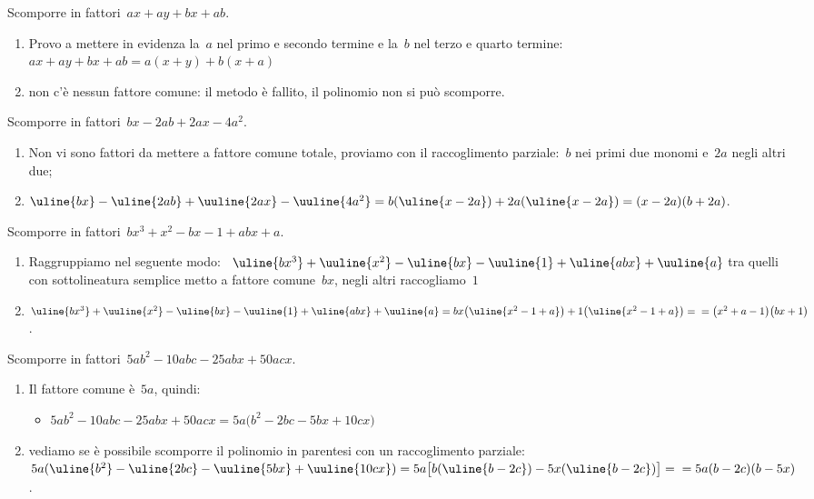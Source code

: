 \begin{esempio}{}{}
Scomporre in fattori~\(ax+ay+bx+ab\).
\begin{enumerate} [left=0mm, noitemsep]
\item Provo a mettere in evidenza la~\(a\) nel primo e secondo termine e 
la~\(b\) nel terzo e quarto termine:~\(ax+ay+bx+ab=a(x+y)+b(x+a)\)
\item non c'è nessun fattore comune: il metodo è fallito, il polinomio non 
si può scomporre.
\end{enumerate}
\end{esempio}


\begin{esempio}{}{}
Scomporre in fattori~\(bx-2ab+2ax-4a^{2}\).
\begin{enumerate} [left=0mm, noitemsep]
\item Non vi sono fattori da mettere a fattore comune totale, proviamo con 
il raccoglimento parziale:~\(b\) nei primi due monomi e~\(2a\) negli altri 
due;
\item \(\uline{bx} -\uline{2ab}+\uuline{2ax}-
  \uuline{4a^{2}}=
  b(\uline{x-2a})+2a(\uline{x-2a})=(x-2a)(b+2a)\).
\end{enumerate}
\end{esempio}

\begin{esempio}{}{}
Scomporre in fattori~\(bx^3+x^2-bx-1+abx+a\).
\begin{enumerate} [left=0mm, noitemsep]
\item Raggruppiamo nel seguente modo:~
\(\uline{bx^3}+\uuline{x^2}-\uline{bx}-
\uuline{1}+\uline{abx}+\uuline{a}\) 
tra quelli con sottolineatura semplice metto a fattore comune~\(bx\), 
negli altri raccogliamo~\(1\)
\item
\(\uline{bx^3}+\uuline{x^2}-\uline{bx}-
\uuline{1}+\uline{abx}+\uuline{a}=
bx\bigl(\uline{x^2-1+a}\bigr)+1\bigl(\uline{x^2-1+a}\bigr)=\newline
=\bigl(x^2+a-1\bigr)\bigl(bx+1\bigr)\).
\end{enumerate}
\end{esempio}

\begin{esempio}{}{}
Scomporre in fattori~\(5ab^{2}-10abc-25abx+50acx\).
\begin{enumerate} [left=0mm, noitemsep]
\item Il fattore comune è~\(5a\), quindi:
\begin{itemize}[nosep]
\item \(5ab^{2}-10abc-25abx+50acx=5a\bigl(b^{2}-2bc-5bx+10cx\bigr)\)
\end{itemize}
\item vediamo se è possibile scomporre il polinomio in parentesi con un 
raccoglimento parziale: \(5a(\uline{b^{2}}-\uline{2bc}
-\uuline{5bx}+\uuline{10cx})=
5a\bigl[b(\uline{b-2c})-5x(\uline{b-2c})\bigr]=\newline
=5a(b-2c)(b-5x)\).
\end{enumerate}
\end{esempio}

